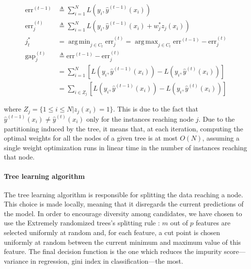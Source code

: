 \documentclass{article}
\DeclareMathOperator*{\argmin}{arg\,min}
\DeclareMathOperator*{\argmax}{arg\,max}
\begin{document}
\vspace*{-\baselineskip}
\begin{align}\label{eq:nodeSel}
\text{err}^{(t-1)} & \triangleq \sum_{i=1}^{N} L \left(y_i, 
\hat{y}^{(t-1)}(x_i)  \right) \\
\text{err}_j^{(t)} & \triangleq \sum_{i=1}^{N} L \left(y_i, 
\hat{y}^{(t-1)}(x_i) + w_j^* z_j(x_i)  \right) \\
j_t^* &= \argmin_{j \in C_t} \text{err}_j^{(t)} = \argmax_{j \in C_t} 
\text{err}^{(t-1)} - \text{err}_j^{(t)} \\
\text{gap}_j^{(t)} & \triangleq \text{err}^{(t-1)} - \text{err}_j^{(t)} \\
&= \sum_{i=1}^{N} \left[ L\left(y_i, \hat{y}^{(t-1)}(x_i)\right) - L\left(y_i, 
\hat{y}^{(t)}(x_i)\right) \right] \\
&= \sum_{i\in Z_j} \left[ L\left(y_i, \hat{y}^{(t-1)}(x_i)\right) - L\left(y_i, 
\hat{y}^{(t)}(x_i)\right) \right]
\end{align}
\vspace*{-\baselineskip}

where $Z_j = \{1 \leq i \leq N | z_j (x_i) = 1 \}$. This is due to the fact that
$\hat{y}^{(t-1)}(x_i) \neq \hat{y}^{(t)}(x_i)$ only for the instances 
reaching node $j$. Due to the partitioning induced by the tree, 
it means that, at each iteration, computing the optimal weights for all the 
nodes of a given tree is at most $O(N)$, assuming a single weight optimization 
runs in linear time in the number of instances reaching that node.

\paragraph{Tree learning algorithm}
The tree learning algorithm is responsible for splitting the data reaching a 
node. This choice is made locally, meaning that it disregards the current 
predictions of the model. In order to encourage diversity among candidates, we 
have chosen to use the Extremely randomized trees's splitting rule 
\cite{extratrees}: $m$ out of $p$ features are selected uniformly at random 
and, for each feature, a cut point is chosen uniformly at random between the 
current minimum and maximum value of this feature. The final decision function 
is the one which reduces the impurity score---variance in regression, gini 
index in classification---the most.
\end{document}
